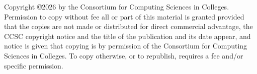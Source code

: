 Copyright \copyright 2026 by the Consortium for Computing Sciences in Colleges.
Permission to copy without fee all or part of this material is granted provided
that the copies are not made or distributed for direct commercial advantage,
the CCSC copyright notice and the title of the publication and its date appear,
and notice is given that copying is by permission of the Consortium for
Computing Sciences in Colleges.  To copy otherwise, or to republish, requires
a fee and/or specific permission.
